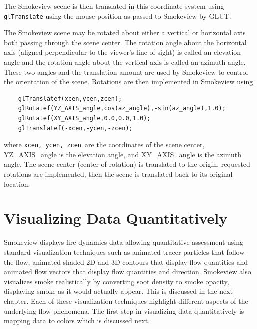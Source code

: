 \documentclass[11pt,twoside]{book}
\begin{document}
The Smokeview scene is then translated in this coordinate system using {\tt glTranslate}
using the mouse position as passed to Smokeview by GLUT.

The Smokeview scene may be rotated about either a vertical or horizontal axis both passing through the scene center.  The rotation angle about the horizontal axis (aligned perpendicular to the viewer's line of sight) is called an elevation angle and the rotation angle about the vertical axis is called an azimuth angle.
These two angles and the translation amount are used by Smokeview to control the orientation of the scene.   Rotations are then implemented in Smokeview using
\begin{verbatim}
    glTranslatef(xcen,ycen,zcen);
    glRotatef(YZ_AXIS_angle,cos(az_angle),-sin(az_angle),1.0);
    glRotatef(XY_AXIS_angle,0.0,0.0,1.0);
    glTranslatef(-xcen,-ycen,-zcen);
\end{verbatim}
where {\tt xcen, ycen, zcen}\ are the coordinates of the scene center, YZ\_AXIS\_angle is the elevation angle, and XY\_AXIS\_angle is the azimuth angle.  The scene center (center of rotation) is translated to the origin, requested rotations are implemented, then the scene is translated back to its original location.





%
%
\part{Visualizing Data Quantitatively}
Smokeview displays fire dynamics data allowing quantitative assessment using
standard visualization techniques such as animated tracer
particles that follow the flow, animated shaded 2D and 3D contours
that display flow quantities and animated flow vectors that
display flow quantities and direction. Smokeview also visualizes
smoke realistically by converting soot density to smoke opacity,
displaying smoke as it would actually appear. This is discussed in the next chapter.
Each of these visualization
techniques highlight different aspects of the underlying flow
phenomena.  The first step in visualizing data quantitatively is mapping data to colors which is discussed next.
\end{document}
